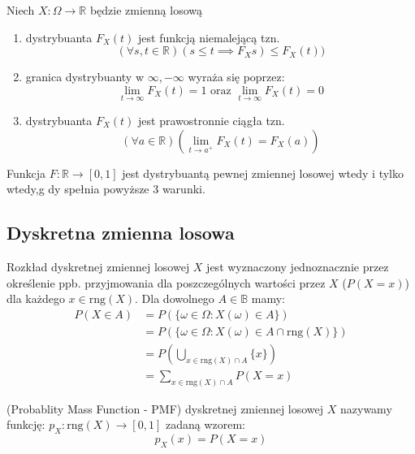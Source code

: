 \documentclass{article}
\newenvironment{definition}[1]{%
    \trivlist
    \item[\hskip\labelsep\textbf{Definition. #1.}]
    \ignorespaces
}{%
    \endtrivlist
}
\newenvironment{theorem}[1]{%
    \trivlist
    \item[\hskip\labelsep\textbf{Theorem. #1.}]
    \ignorespaces
}{%
    \endtrivlist
}
\newenvironment{information}[1]{%
    \trivlist
    \item[\hskip\labelsep\textbf{Information. #1.}]
    \ignorespaces
}{%
    \endtrivlist
}
\begin{document}
\begin{information}{Własności dystrybuanty}
    Niech $X: \Omega \rightarrow \mathbb{R}$ będzie zmienną losową
    \begin{enumerate}
        \item dystrybuanta $F_X(t)$ jest funkcją niemalejącą tzn.
        \[
        (\forall s,t \in \mathbb{R}) (s\leq t \implies F_Xs) \leq F_X(t))
        \]
        \item granica dystrybuanty w $\infty, -\infty$ wyraża się poprzez:
        \[
        \lim_{t\rightarrow\infty} F_X(t)=1 \text{ oraz } \lim_{t\rightarrow\infty} F_X(t) = 0
        \]
        \item dystrybuanta $F_X(t)$ jest prawostronnie ciągła tzn.
        \[
        (\forall a\in\mathbb{R})\left(\lim_{t\rightarrow a^{+}} F_X(t) = F_X(a)\right)
        \]
    \end{enumerate}
\end{information}

\begin{theorem}{Twierdzenie}
    Funkcja $F: \mathbb{R} \rightarrow [0,1]$ jest dystrybuantą pewnej zmiennej losowej wtedy i tylko wtedy,g dy spełnia powyższe 3 warunki.
\end{theorem}

\subsection{Dyskretna zmienna losowa}

\begin{theorem}{Dyskretna zmienna losowa}
    Rozkład dyskretnej zmiennej losowej $X$ jest wyznaczony jednoznacznie przez określenie ppb. przyjmowania dla poszczególnych wartości przez $X$ ($P(X=x)$) dla każdego $x\in \text{rng}(X)$. Dla dowolnego $A\in\mathbb{B}$ mamy:
    \begin{align}
        P(X\in A) &= P(\{\omega \in \Omega : X(\omega) \in A\}) \\
        &= P(\{\omega \in \Omega: X(\omega) \in A \cap \text{rng}(X)\})\\
        &= P\left(\bigcup_{x\in \text{rng}(X) \cap A} \{x\}\right) \\
        &= \sum_{x\in \text{rng}(X) \cap A} P(X=x)
    \end{align}
\end{theorem}

\begin{definition}{Funkcja masy prawdopodobieństwa}
    (Probablity Mass Function - PMF) dyskretnej zmiennej losowej $X$ nazywamy funkcję:
    $p_X : \text{rng}(X) \rightarrow [0,1]$ zadaną wzorem:
    \[
    p_X(x) = P(X=x)
    \]
\end{definition}
\end{document}
